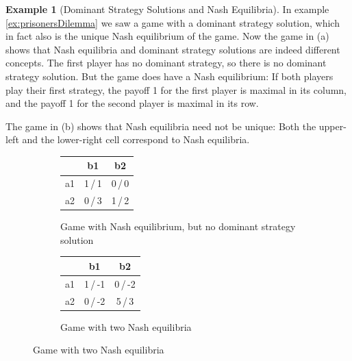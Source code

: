 \documentclass[a4paper,DIV=11,abstracton,twoside=semi]{scrreprt}
\theoremstyle{definition}
\newtheorem{ex}[thm]{Example} %
\begin{document}
    \begin{ex}[Dominant Strategy Solutions and Nash Equilibria]
        In example \ref{ex:prisonersDilemma} we saw a game with a dominant strategy solution, which in fact also is the unique Nash equilibrium of the game.
        Now the game in (a)
        shows that Nash equilibria and dominant strategy solutions are indeed different concepts. The first player has no dominant strategy, so there is no dominant strategy solution. But the game does have a Nash equilibrium: If both players play their first strategy, the payoff 1 for the first player is maximal in its column, and the payoff 1 for the second player is maximal in its row.
        
        The game in (b)
        shows that Nash equilibria need not be unique: Both the upper-left and the lower-right cell correspond to Nash equilibria.
        
        \begin{figure}[h]
            \centering
            \begin{subfigure}[t]{0.49\textwidth}
                \centering
                \begin{tabular}{c|c|c|}
                	   &   b1    &   b2    \\ \hline
                	a1 & 1\,/\,1 & 0\,/\,0 \\ \hline
                	a2 & 0\,/\,3 & 1\,/\,2 \\ \hline
                \end{tabular}
                \caption{Game with Nash equilibrium, but no dominant strategy solution}
                \label{fig:nashEquilibriumNoDominantStrategy}
            \end{subfigure}
            \begin{subfigure}[t]{0.49\textwidth}
                \centering
                \begin{tabular}{c|c|c|}
                    &   b1    &   b2    \\ \hline
                    a1 & 1\,/\,-1 & 0\,/\,-2 \\ \hline
                    a2 & 0\,/\,-2 & 5\,/\,3 \\ \hline
                \end{tabular}
                \caption{Game with two Nash equilibria}   
                \label{fig:twoNashEquilibria}
            \end{subfigure}
        \end{figure}
    \end{ex}
    
\end{document}
